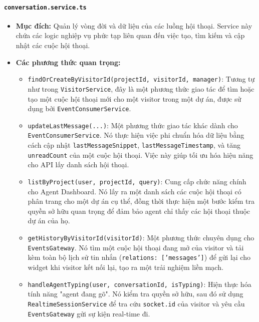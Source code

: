 \paragraph{\texttt{conversation.service.ts}}
\begin{itemize}
    \item \textbf{Mục đích:} Quản lý vòng đời và dữ liệu của các luồng hội thoại. Service này chứa các logic nghiệp vụ phức tạp liên quan đến việc tạo, tìm kiếm và cập nhật các cuộc hội thoại.
    \item \textbf{Các phương thức quan trọng:}    
    \begin{itemize}
        \item \texttt{findOrCreateByVisitorId(projectId, visitorId, manager)}: Tương tự như trong \texttt{VisitorService}, đây là một phương thức giao tác để tìm hoặc tạo một cuộc hội thoại mới cho một visitor trong một dự án, được sử dụng bởi \texttt{EventConsumerService}.
        \item \texttt{updateLastMessage(...)}: Một phương thức giao tác khác dành cho \texttt{EventConsumerService}. Nó thực hiện việc phi chuẩn hóa dữ liệu bằng cách cập nhật \texttt{lastMessageSnippet}, \texttt{lastMessageTimestamp}, và tăng \texttt{unreadCount} của một cuộc hội thoại. Việc này giúp tối ưu hóa hiệu năng cho API lấy danh sách hội thoại.
        \item \texttt{listByProject(user, projectId, query)}: Cung cấp chức năng chính cho Agent Dashboard. Nó lấy ra một danh sách các cuộc hội thoại có phân trang cho một dự án cụ thể, đồng thời thực hiện một bước kiểm tra quyền sở hữu quan trọng để đảm bảo agent chỉ thấy các hội thoại thuộc dự án của họ.
        \item \texttt{getHistoryByVisitorId(visitorId)}: Một phương thức chuyên dụng cho \texttt{EventsGateway}. Nó tìm một cuộc hội thoại đang mở của visitor và tải kèm toàn bộ lịch sử tin nhắn (\texttt{relations: ['messages']}) để gửi lại cho widget khi visitor kết nối lại, tạo ra một trải nghiệm liền mạch.
        \item \texttt{handleAgentTyping(user, conversationId, isTyping)}: Hiện thực hóa tính năng "agent đang gõ". Nó kiểm tra quyền sở hữu, sau đó sử dụng \texttt{RealtimeSessionService} để tra cứu \texttt{socket.id} của visitor và yêu cầu \texttt{EventsGateway} gửi sự kiện real-time đi.
    \end{itemize}
\end{itemize}

